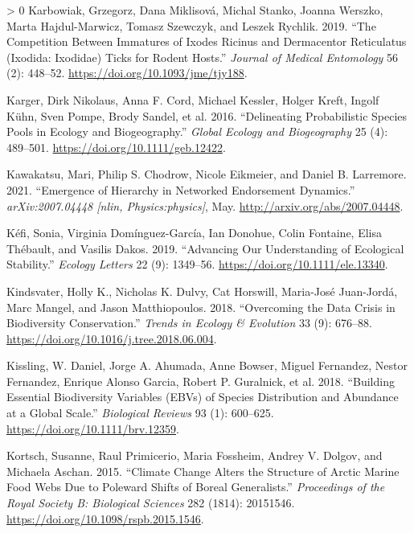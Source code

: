 \documentclass[10pt,oneside]{article}
\newlength{\cslhangindent}
\newenvironment{CSLReferences}[3] %
 {%
  \setlength{\parindent}{0pt}
  \ifodd #1 \everypar{\setlength{\hangindent}{\cslhangindent}}\ignorespaces\fi
  \ifnum #2 > 0
  \setlength{\parskip}{#2\baselineskip}
  \fi
 }%
 {}
\begin{document}
\begin{CSLReferences}{1}{0}
\leavevmode\hypertarget{ref-Karbowiak2019ComImm}{}%
Karbowiak, Grzegorz, Dana Miklisová, Michal Stanko, Joanna Werszko,
Marta Hajdul-Marwicz, Tomasz Szewczyk, and Leszek Rychlik. 2019. {``The
Competition Between Immatures of Ixodes Ricinus and Dermacentor
Reticulatus (Ixodida: Ixodidae) Ticks for Rodent Hosts.''} \emph{Journal
of Medical Entomology} 56 (2): 448--52.
\url{https://doi.org/10.1093/jme/tjy188}.

\leavevmode\hypertarget{ref-Karger2016DelPro}{}%
Karger, Dirk Nikolaus, Anna F. Cord, Michael Kessler, Holger Kreft,
Ingolf Kühn, Sven Pompe, Brody Sandel, et al. 2016. {``Delineating
Probabilistic Species Pools in Ecology and Biogeography.''} \emph{Global
Ecology and Biogeography} 25 (4): 489--501.
\url{https://doi.org/10.1111/geb.12422}.

\leavevmode\hypertarget{ref-Kawakatsu2021EmeHie}{}%
Kawakatsu, Mari, Philip S. Chodrow, Nicole Eikmeier, and Daniel B.
Larremore. 2021. {``Emergence of Hierarchy in Networked Endorsement
Dynamics.''} \emph{arXiv:2007.04448 {[}nlin, Physics:physics{]}}, May.
\url{http://arxiv.org/abs/2007.04448}.

\leavevmode\hypertarget{ref-Kefi2019AdvOur}{}%
Kéfi, Sonia, Virginia Domínguez-García, Ian Donohue, Colin Fontaine,
Elisa Thébault, and Vasilis Dakos. 2019. {``Advancing Our Understanding
of Ecological Stability.''} \emph{Ecology Letters} 22 (9): 1349--56.
\url{https://doi.org/10.1111/ele.13340}.

\leavevmode\hypertarget{ref-Kindsvater2018OveDat}{}%
Kindsvater, Holly K., Nicholas K. Dulvy, Cat Horswill, Maria-José
Juan-Jordá, Marc Mangel, and Jason Matthiopoulos. 2018. {``Overcoming
the Data Crisis in Biodiversity Conservation.''} \emph{Trends in Ecology
\& Evolution} 33 (9): 676--88.
\url{https://doi.org/10.1016/j.tree.2018.06.004}.

\leavevmode\hypertarget{ref-Kissling2018BuiEss}{}%
Kissling, W. Daniel, Jorge A. Ahumada, Anne Bowser, Miguel Fernandez,
Nestor Fernandez, Enrique Alonso Garcia, Robert P. Guralnick, et al.
2018. {``Building Essential Biodiversity Variables (EBVs) of Species
Distribution and Abundance at a Global Scale.''} \emph{Biological
Reviews} 93 (1): 600--625. \url{https://doi.org/10.1111/brv.12359}.

\leavevmode\hypertarget{ref-Kortsch2015CliCha}{}%
Kortsch, Susanne, Raul Primicerio, Maria Fossheim, Andrey V. Dolgov, and
Michaela Aschan. 2015. {``Climate Change Alters the Structure of Arctic
Marine Food Webs Due to Poleward Shifts of Boreal Generalists.''}
\emph{Proceedings of the Royal Society B: Biological Sciences} 282
(1814): 20151546. \url{https://doi.org/10.1098/rspb.2015.1546}.


\end{CSLReferences}
\end{document}
